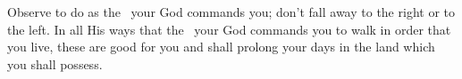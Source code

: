 \begin{enumerate}
  \setcounter{enumi}{31}
   Observe to do as the \lord\ your God commands you; don't fall away to the right or to the left.%
   In all His ways that the \lord\ your God commands you to walk in order that you live, these are good for you and shall prolong your days in the land which you shall possess.%
\end{enumerate}
